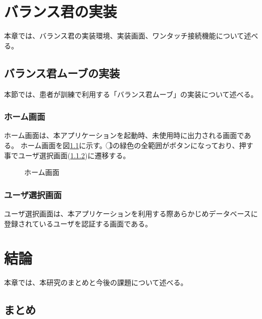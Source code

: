 \documentclass[uplatex,a4paper,12pt]{jsreport}
\begin{document}

\chapter{バランス君の実装}\label{chap:jisso}
本章では、バランス君の実装環境、実装画面、ワンタッチ接続機能について述べる。

\section{バランス君ムーブの実装}\label{sec:rihabiri_jisso}
本節では、患者が訓練で利用する「バランス君ムーブ」の実装について述べる。

\subsection{ホーム画面}\label{sec:home}
ホーム画面は、本アプリケーションを起動時、未使用時に出力される画面である。
ホーム画面を図\ref{fig:p_home}に示す。
\textcircled{\scriptsize 1}の緑色の全範囲がボタンになっており、押す事でユーザ選択画面(\ref{sec:all})に遷移する。
	
\begin{figure}[htbp]
  \centering %
  \fbox{
%
%
%
  }
  \caption{ホーム画面}\label{fig:p_home}
\end{figure}

\subsection{ユーザ選択画面}\label{sec:all}
ユーザ選択画面は、本アプリケーションを利用する際あらかじめデータベースに登録されているユーザを認証する画面である。


\chapter{結論}\label{chap:keturon}
本章では、本研究のまとめと今後の課題について述べる。

\section{まとめ}\label{sec:matome}
 
\end{document}
